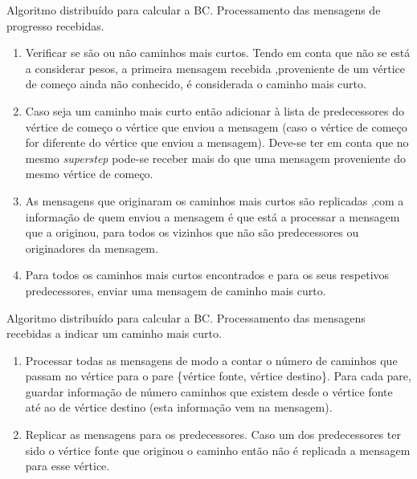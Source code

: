 \begin{algorithm}
  \caption{Algoritmo distribuído para calcular a BC. Processamento das 
mensagens de progresso recebidas.}
  \label{alg:msgprogbc}
  \begin{enumerate}  
    \item Verificar se são ou não caminhos mais curtos. Tendo em 
conta que não se está a considerar pesos, a primeira mensagem recebida 
,proveniente de um vértice de começo ainda não conhecido, é considerada o 
caminho mais curto.
    \item Caso seja um caminho mais curto então adicionar à lista de 
predecessores do vértice de começo o vértice que enviou a mensagem (caso o 
vértice de começo for diferente do vértice que enviou a mensagem). Deve-se 
ter em conta que no mesmo \textit{superstep} pode-se receber mais do que uma 
mensagem proveniente do mesmo vértice de começo.
    \item As mensagens que originaram os caminhos mais curtos são 
replicadas ,com a informação de quem enviou a mensagem é que está a processar 
a mensagem que a originou, para todos os vizinhos que não são predecessores ou 
originadores da mensagem.
    \item Para todos os caminhos mais curtos encontrados e para os 
seus respetivos predecessores, enviar uma mensagem de caminho mais curto.
  \end{enumerate}
\end{algorithm}

\begin{algorithm}
  \caption{Algoritmo distribuído para calcular a BC. Processamento das 
mensagens recebidas a indicar um caminho mais curto.}
  \label{alg:msgpathbc}
  \begin{enumerate}  
     \item Processar todas as mensagens de modo a contar o número de 
caminhos que passam no vértice para o pare \{vértice fonte, vértice destino\}. 
Para cada pare, guardar informação de número caminhos que existem desde o 
vértice fonte até ao de vértice destino (esta informação vem na mensagem).
     \item Replicar as mensagens para os predecessores. Caso um dos 
predecessores ter sido o vértice fonte que originou o caminho então não é 
replicada a mensagem para esse vértice.
  \end{enumerate}
\end{algorithm}

